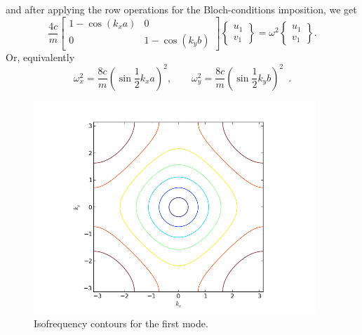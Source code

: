 \documentclass[12pt,letterpaper]{article}
\begin{document}
and after applying the row operations for the Bloch-conditions imposition, we get
\begin{equation}
\frac{4c}{m}\left[ \begin{array}{cc}
1 - \cos(k_x a) & 0 \\ 
0 & 1-\cos(k_y b)
\end{array}  \right] \left\lbrace \begin{array}{c}
u_1 \\ 
v_1 
\end{array}  \right\rbrace = \omega^2 \left\lbrace \begin{array}{c}
u_1 \\ 
v_1 
\end{array}  \right\rbrace .
\end{equation}
Or, equivalently
\begin{equation}
\omega_x^2 = \frac{8c}{m}\left( \sin \frac{1}{2}k_x a\right)^2,\qquad \omega_y^2 = \frac{8c}{m}\left( \sin \frac{1}{2}k_y b \right)^2 \enspace .
\end{equation}
\begin{figure}[h]
\centering
\includegraphics[height=8cm]{img/square-mass_lattice-contours.png} 
\caption{Isofrequency contours for the first mode.}
\end{figure}
\end{document}
